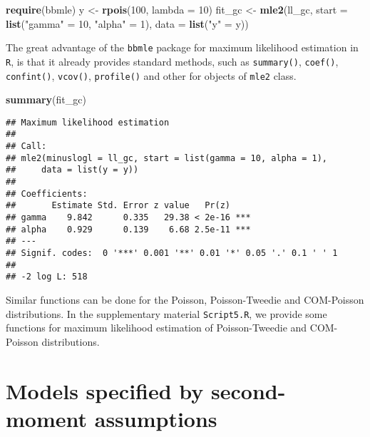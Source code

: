 \documentclass[9pt,a5paper,]{book}
\newenvironment{Shaded}{}{}
\newcommand{\KeywordTok}[1]{\textbf{{#1}}}
\newcommand{\DataTypeTok}[1]{\underline{{#1}}}
\newcommand{\DecValTok}[1]{{#1}}
\newcommand{\StringTok}[1]{{#1}}
\newcommand{\NormalTok}[1]{{#1}}
\renewenvironment{Shaded}{\color{inputcolor}}{}
\renewcommand{\DataTypeTok}[1]{{#1}}
\theoremstyle{definition}
\theoremstyle{definition}
\theoremstyle{remark}
\begin{document}
\begin{Shaded}
\begin{Highlighting}[]
\KeywordTok{require}\NormalTok{(bbmle)}
\NormalTok{y <-}\StringTok{ }\KeywordTok{rpois}\NormalTok{(}\DecValTok{100}\NormalTok{, }\DataTypeTok{lambda =} \DecValTok{10}\NormalTok{)}
\NormalTok{fit_gc <-}\StringTok{ }\KeywordTok{mle2}\NormalTok{(ll_gc, }\DataTypeTok{start =} \KeywordTok{list}\NormalTok{(}\StringTok{"gamma"} \NormalTok{=}\StringTok{ }\DecValTok{10}\NormalTok{, }\StringTok{"alpha"} \NormalTok{=}\StringTok{ }\DecValTok{1}\NormalTok{),}
               \DataTypeTok{data =} \KeywordTok{list}\NormalTok{(}\StringTok{"y"} \NormalTok{=}\StringTok{ }\NormalTok{y))}
\end{Highlighting}
\end{Shaded}

The great advantage of the \texttt{bbmle} package for maximum likelihood
estimation in \texttt{R}, is that it already provides standard methods,
such as \texttt{summary()}, \texttt{coef()}, \texttt{confint()},
\texttt{vcov()}, \texttt{profile()} and other for objects of
\texttt{mle2} class.

\begin{Shaded}
\begin{Highlighting}[]
\KeywordTok{summary}\NormalTok{(fit_gc)}
\end{Highlighting}
\end{Shaded}

\begin{verbatim}
## Maximum likelihood estimation
## 
## Call:
## mle2(minuslogl = ll_gc, start = list(gamma = 10, alpha = 1), 
##     data = list(y = y))
## 
## Coefficients:
##       Estimate Std. Error z value   Pr(z)    
## gamma    9.842      0.335   29.38 < 2e-16 ***
## alpha    0.929      0.139    6.68 2.5e-11 ***
## ---
## Signif. codes:  0 '***' 0.001 '**' 0.01 '*' 0.05 '.' 0.1 ' ' 1
## 
## -2 log L: 518
\end{verbatim}

Similar functions can be done for the Poisson, Poisson-Tweedie and
COM-Poisson distributions. In the supplementary material
\texttt{Script5.R}, we provide some functions for maximum likelihood
estimation of Poisson-Tweedie and COM-Poisson distributions.

\chapter{Models specified by second-moment assumptions}\label{SM}
\end{document}
